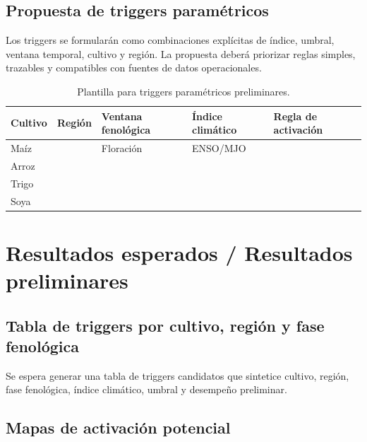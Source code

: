 
\subsection{Propuesta de triggers paramétricos}

Los triggers se formularán como combinaciones explícitas de índice, umbral, ventana temporal, cultivo y región. La propuesta deberá priorizar reglas simples, trazables y compatibles con fuentes de datos operacionales.


\begin{table}[H]
\centering
\caption{Plantilla para triggers paramétricos preliminares.}
\label{tab:triggers}
\begin{tabular}{p{2cm}p{2.7cm}p{2.5cm}p{2.5cm}p{3.2cm}}
\toprule
Cultivo & Región & Ventana fenológica & Índice climático & Regla de activación \\
\midrule
Maíz & %
& Floración & ENSO/MJO & %
\\
Arroz & %
& %
& %
& %
\\
Trigo & %
& %
& %
& %
\\
Soya & %
& %
& %
& %
\\
\bottomrule
\end{tabular}
\end{table}

\section{Resultados esperados / Resultados preliminares}

\subsection{Tabla de triggers por cultivo, región y fase fenológica}

Se espera generar una tabla de triggers candidatos que sintetice cultivo, región, fase fenológica, índice climático, umbral y desempeño preliminar.


\subsection{Mapas de activación potencial}


